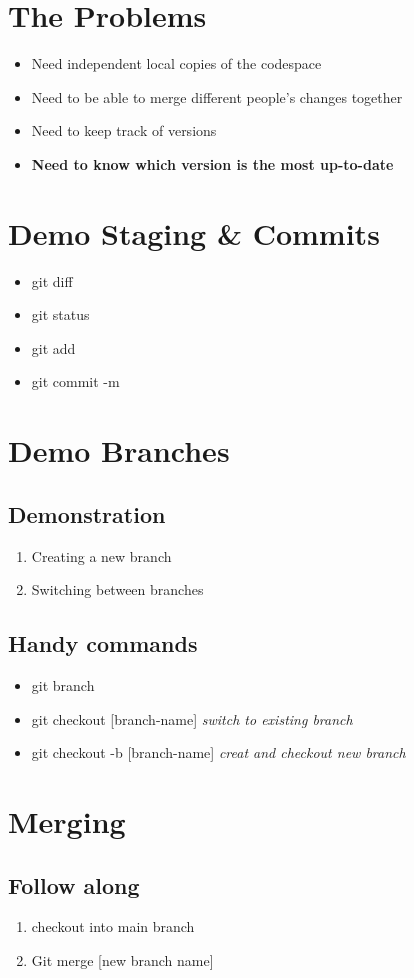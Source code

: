 \documentclass{assignment}
\date{\today}
\begin{document}
   \section{The Problems}
   \begin{itemize}
    \item Need independent local copies of the codespace
    \item Need to be able to merge different people's changes together
    \item Need to keep track of versions
    \item \textbf{Need to know which version is the most up-to-date}
   \end{itemize}
   \section{Demo Staging \& Commits}
   \begin{itemize}
   \item git diff
   \item git status
   \item git add
   \item git commit -m
   \end{itemize}
   \section{Demo Branches}
   \subsection{Demonstration}
   \begin{enumerate}
   \item Creating a new branch
   \item Switching between branches
   \end{enumerate}
   \subsection{Handy commands}
   \begin{itemize}
    \item git branch
    \item git checkout [branch-name]  \textit{switch to  existing branch}
    \item git checkout -b [branch-name] \textit{creat and checkout new branch}
   \end{itemize} 
   \section{Merging}
   \subsection{Follow along}
   \begin{enumerate}
    \item checkout into main branch
    \item Git merge [new branch name]
   \end{enumerate}
\end{document}

